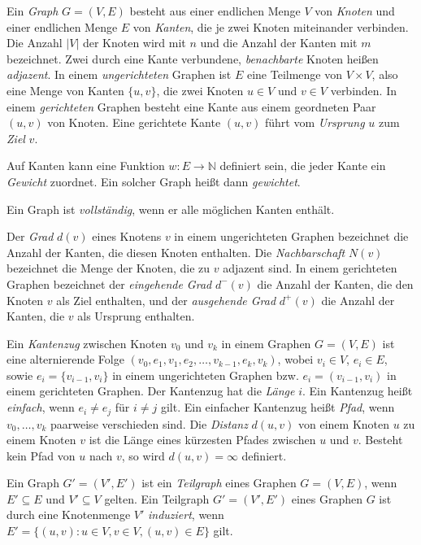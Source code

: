 Ein \emph{Graph} $G=(V, E)$ besteht aus einer endlichen Menge $V$ von
\emph{Knoten} und einer endlichen Menge $E$ von \emph{Kanten}, die je
zwei Knoten miteinander verbinden. Die Anzahl $|V|$ der Knoten wird mit
$n$ und die Anzahl der Kanten mit $m$ bezeichnet. Zwei durch eine
Kante verbundene, \emph{benachbarte} Knoten heißen
\emph{adjazent}. In einem \emph{ungerichteten} Graphen ist $E$ eine
Teilmenge von $V\times V$, also eine Menge von Kanten $\{u, v\}$, die
zwei Knoten $u \in V$ und $v\in V$ verbinden. In einem
\emph{gerichteten} Graphen besteht eine Kante aus einem geordneten
Paar $(u, v)$ von Knoten. Eine gerichtete Kante $(u, v)$ führt vom
\emph{Ursprung} $u$ zum \emph{Ziel} $v$.

Auf Kanten kann eine Funktion $w: E \rightarrow \mathbb{N}$ definiert
sein, die jeder Kante ein \emph{Gewicht} zuordnet. Ein solcher Graph
heißt dann \emph{gewichtet}.

Ein Graph ist \emph{vollständig}, wenn er alle möglichen Kanten
enthält.

Der \emph{Grad} $d(v)$ eines Knotens $v$ in einem ungerichteten
Graphen bezeichnet die Anzahl der Kanten, die diesen Knoten
enthalten. Die \emph{Nachbarschaft} $N(v)$ bezeichnet die Menge der
Knoten, die zu $v$ adjazent sind. In einem gerichteten Graphen
bezeichnet der \emph{eingehende Grad} $d^{-}(v)$ die Anzahl der
Kanten, die den Knoten $v$ als Ziel enthalten, und der
\emph{ausgehende Grad} $d^{+}(v)$ die Anzahl der Kanten, die $v$ als
Ursprung enthalten.

Ein \emph{Kantenzug} zwischen Knoten $v_0$ und $v_k$ in einem Graphen
$G=(V, E)$ ist eine alternierende Folge $(v_0, e_1, v_1, e_2, \dots,
v_{k-1}, e_k, v_k)$, wobei $v_i \in V$, $e_i \in E$, sowie $e_i =
\{v_{i-1}, v_{i}\}$ in einem ungerichteten Graphen bzw. $e_i =
(v_{i-1}, v_{i})$ in einem gerichteten Graphen. Der Kantenzug hat die
\emph{Länge} $i$. Ein Kantenzug heißt \emph{einfach}, wenn $e_i \ne
e_j$ für $i \ne j$ gilt.  Ein einfacher Kantenzug heißt
\emph{Pfad}, wenn $v_0, \dots, v_k$ paarweise verschieden sind. Die
\emph{Distanz} $d(u, v)$ von einem Knoten $u$ zu einem Knoten $v$ ist die
Länge eines kürzesten Pfades zwischen $u$ und $v$. Besteht kein
Pfad von $u$ nach $v$, so wird $d(u,v) = \infty$ definiert.

Ein Graph $G' = (V', E')$ ist ein \emph{Teilgraph} eines Graphen $G =
(V, E)$, wenn $E' \subseteq E$ und $V' \subseteq V$ gelten. Ein
Teilgraph $G' = (V', E')$ eines Graphen $G$ ist durch eine
Knotenmenge $V'$ \emph{induziert}, wenn $E' = \{(u, v) : u \in V, v
\in V, (u, v) \in E\}$ gilt.

